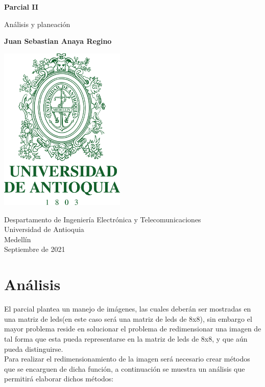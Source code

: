 \documentclass{article}
\begin{document}
\begin{titlepage}
    \begin{center}
        \vspace*{1cm}
            
        \Huge
        \textbf{Parcial II}
            
        \vspace{0.5cm}
        \LARGE
        Análisis y planeación
            
        \vspace{1.5cm}
            
        \textbf{Juan Sebastian Anaya Regino}
            
        \vspace{0.9cm}
        \centering
        \includegraphics[width=6cm]{images/logo.png}
            
        \vfill
            
        \vspace{0.8cm}
            
        \Large
        Despartamento de Ingeniería Electrónica y Telecomunicaciones\\
        Universidad de Antioquia\\
        Medellín\\
        Septiembre de 2021
            
    \end{center}
\end{titlepage}

\section{Análisis}
El parcial plantea un manejo de imágenes, las cuales deberán ser mostradas en una matriz de leds(en este caso será una matriz de leds de 8x8), sin embargo el mayor problema reside en solucionar el problema de redimensionar una imagen de tal forma que esta pueda representarse en la matriz de leds de 8x8, y que aún pueda distinguirse. \\
Para realizar el redimensionamiento de la imagen será necesario crear métodos que se encarguen de dicha función, a continuación se muestra un análisis que permitirá elaborar dichos métodos:
\end{document}
